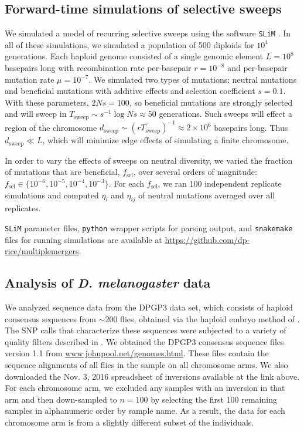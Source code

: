 \documentclass[11pt, letterpaper]{article}   	%
\begin{document}
\subsection*{Forward-time simulations of selective sweeps}

We simulated a model of recurring selective sweeps using the software \texttt{SLiM} \autocite{Messer2013}.
In all of these simulations, we simulated a population of 500 diploids for $10^4$ generations.
Each haploid genome consisted of a single genomic element $L=10^8$ basepairs long with recombination rate per-basepair $r = 10^{-8}$ and per-basepair mutation rate $\mu = 10^{-7}$.
We simulated two types of mutations: neutral mutations and beneficial mutations with additive effects and selection coefficient $s=0.1$.
With these parameters, $2Ns = 100$, so beneficial mutations are strongly selected and will sweep in $T_{\text{sweep}}\sim s^{-1} \log Ns \approx 50$ generations.
Such sweeps will effect a region of the chromosome $d_{\text{sweep}} \sim (r T_{\text{sweep}})^{-1} \approx 2 \times 10^6$ basepairs long.
Thus $d_{\text{sweep}} \ll L$, which will minimize edge effects of simulating a finite chromosome.

In order to vary the effects of sweeps on neutral diversity, we varied the fraction of mutations that are beneficial, $f_{\text{sel}}$, over several orders of magnitude: $f_{\text{sel}} \in \{10^{-6}, 10^{-5}, 10^{-4}, 10^{-3}\}$.
For each $f_{\text{sel}}$, we ran 100 independent replicate simulations and computed $\eta_i$ and $\eta_{ij}$ of neutral mutations averaged over all replicates.

\texttt{SLiM} parameter files, \texttt{python} wrapper scripts for parsing output, and \texttt{snakemake} files for running simulations are available at \url{https://github.com/dp-rice/multiplemergers}.

\subsection*{Analysis of \textit{D. melanogaster} data}

We analyzed sequence data from the DPGP3 data set, which consists of haploid consensus sequences from $\sim 200$ flies, obtained via the haploid embryo method of \textcite{LangleyEtAl2011}.
The SNP calls that characterize these sequences were subjected to a variety of quality filters described in \textcite{LackEtAl2015}.
We obtained the DPGP3 consensus sequence files version 1.1 from \url{www.johnpool.net/genomes.html}.
These files contain the sequence alignments of all flies in the sample on all chromosome arms.
We also downloaded the Nov. 3, 2016 spreadsheet of inversions available at the link above.
For each chromosome arm, we excluded any samples with an inversion in that arm and then down-sampled to $n=100$ by selecting the first 100 remaining samples in alphanumeric order by sample name.
As a result, the data for each chromosome arm is from a slightly different subset of the individuals.
\end{document}
